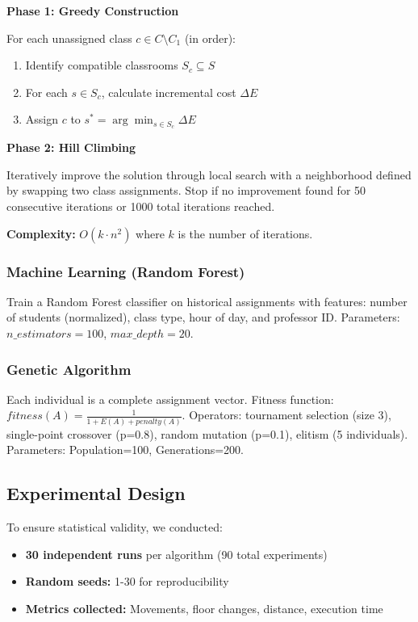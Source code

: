 \documentclass[12pt,a4paper]{article}
\begin{document}
\textbf{Phase 1: Greedy Construction}

For each unassigned class $c \in C \setminus C_1$ (in order):
\begin{enumerate}
\item Identify compatible classrooms $S_c \subseteq S$
\item For each $s \in S_c$, calculate incremental cost $\Delta E$
\item Assign $c$ to $s^* = \arg\min_{s \in S_c} \Delta E$
\end{enumerate}

\textbf{Phase 2: Hill Climbing}

Iteratively improve the solution through local search with a neighborhood defined by swapping two class assignments. Stop if no improvement found for 50 consecutive iterations or 1000 total iterations reached.

\textbf{Complexity:} $O(k \cdot n^2)$ where $k$ is the number of iterations.

\subsubsection{Machine Learning (Random Forest)}

Train a Random Forest classifier on historical assignments with features: number of students (normalized), class type, hour of day, and professor ID. Parameters: $n\_estimators=100$, $max\_depth=20$.

\subsubsection{Genetic Algorithm}

Each individual is a complete assignment vector. Fitness function: $fitness(A) = \frac{1}{1 + E(A) + penalty(A)}$. Operators: tournament selection (size 3), single-point crossover (p=0.8), random mutation (p=0.1), elitism (5 individuals). Parameters: Population=100, Generations=200.

\subsection{Experimental Design}

To ensure statistical validity, we conducted:
\begin{itemize}
\item \textbf{30 independent runs} per algorithm (90 total experiments)
\item \textbf{Random seeds:} 1-30 for reproducibility
\item \textbf{Metrics collected:} Movements, floor changes, distance, execution time
\end{itemize}
\end{document}
